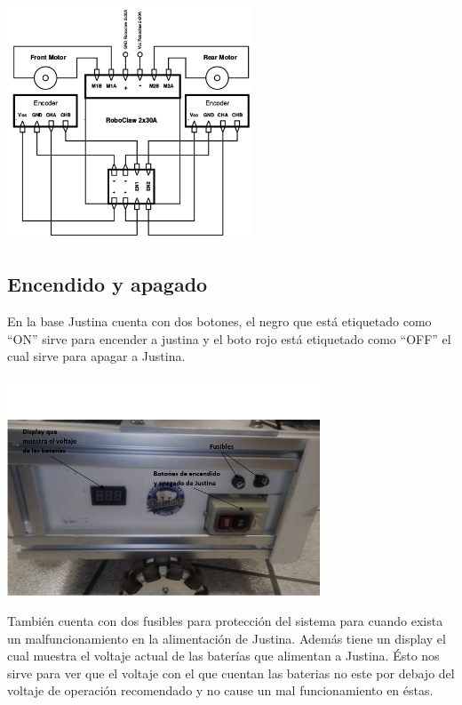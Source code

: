 \documentclass[a4paper]{book}
\begin{document}
\begin{center}
\includegraphics[width=0.55\textwidth]{Figures/Hardware/Esquematicos/Roboclaw_2.png}
\label{fig:Hardware:Partes:Diagrama:Esquematico:Roboclaw:2}
\end{center}


\subsection{Encendido y apagado}

En la base Justina cuenta con dos botones, el negro que está etiquetado como ``ON'' sirve para encender a justina y el boto
rojo está etiquetado como ``OFF'' el cual sirve para apagar a Justina.\\

\begin{center}
\includegraphics[width=0.7\textwidth]{Figures/Hardware/Diagramas/Encendido.png}
\label{fig:Hardware:Diagramas:Justina:Encendido}
\end{center}

También cuenta con dos fusibles para protección del sistema para cuando exista un malfuncionamiento en la alimentación de 
Justina. Además tiene un display el cual muestra el voltaje actual de las baterías que alimentan a Justina. Ésto nos sirve
para ver que el voltaje con el que cuentan las baterias no este por debajo del voltaje de operación recomendado y no cause
un mal funcionamiento en éstas.
\end{document}
